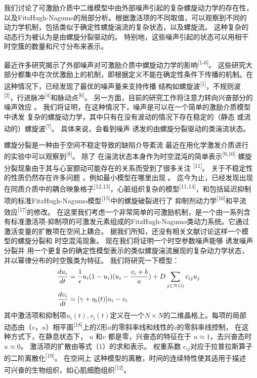 \documentclass[
bachelor,
nofont, %
pdflinks,
]{xjtuthesis}
\begin{document}

\newcommand{\apcite}[1]{\textsuperscript{[#1]}}


我们讨论了可激励介质中⼆维模型中由外部噪声引起的复杂螺旋动⼒学的存在性，以及FitzHugh-Nagumo的局部分析。根据激活项的不同取值，可以观察到不同的动⼒学机制，包括类似于确定性螺旋湍流的复杂状态，以及螺旋流。 这种复杂的动态⾏为被认为是由螺旋分裂驱动的。 
特别地，这些噪声引起的状态可以⽤相⼲时空簇的数量和尺⼨分布来表示。 


最近许多研究揭⽰了外部噪声对可激励介质中螺旋动⼒学的影响\apcite{1-6}。 这些研究⼤部分都集中在次优激励上的机制，即根据定义不能在确定性条件下传播的机制。在这种情况下，已经发现了最优的噪声量来⽀持传播
结构如螺旋波\apcite{1}，不规则波\apcite{2}，⾏进脉冲\apcite{4}和脉动点\apcite{6}。
另⼀⽅⾯，⽬前的研究⼯作将注意⼒转向兴奋部分的噪声效应
。 我们将证明，在这种情况下，噪声是可以在⼀个简单的激励介质模型中诱发
复杂的螺旋动⼒学，其中只有在没有波动的情况下存在稳定的（静态
或流动的）螺旋波\apcite{7}。 具体来说，会看到噪声
诱发的由螺旋分裂驱动的类湍流状态。

\medskip

螺旋分裂是⼀种由于空间不稳定导致的缺陷介导紊流
最近在⽤化学激发介质进⾏的实验中可以观察到\apcite{8}。 除了
在湍流状态本⾝作为时空混沌的简单表⽰\apcite{9,10}
螺旋分裂现象由于其与⼼室颤动可能存在的关系⽽受到了很多关注
\apcite{11}。 关于不稳定性的性质仍然存在许多问题
，例如最⼩模型在哪里出现
。 迄今为⽌，已经发现出现在同质介质中的耦合映象格子\apcite{12,13}，⼼脏组织复杂的模型\apcite{11,14}，和包括延迟抑制项的标准FitzHugh-Nagumo模型\apcite{15}中的螺旋破裂进⾏了
抑制剂动⼒学\apcite{16}和平流效应\apcite{17}的修改。 在这⾥我们考虑⼀个⾮常简单的可激励机制，是一个由⼀系列含有标准激活项-抑制项的可激发元素组成的FitzHugh-Nagumo类动⼒系统。它通过激活变量的扩散项在空间上耦合。
据我们所知，还没有相关文献讨论这样⼀个模型的螺旋分裂和
时空混沌现象。 现在我们将证明⼀个时空参数噪声能够
诱发噪声分裂并
用一个更复杂的确定性模型表示的类似螺旋湍流展现的复杂动⼒学状态，并以幂律分布的时空簇类为特征。
\medskip
我们将研究一下模型：
\begin{align}
\dfrac{du_i}{dt}&=\dfrac{1}{\epsilon}u_i(1-u_i)(u_i-\dfrac{v_i+b}{a})+D\sum_{j \in N(i)}c_{ij}u_j\\
\notag \dfrac{dv_i}{dt}&=[\gamma+\eta_i(t)]u_i-v_i
\end{align}
其中激活项和抑制项$u_i(t),v_i(t)$定义在一个$N\times N$的二维晶格上。每项的局部动态由$（ v，u ）$相平⾯\apcite{18}上的Z形$u$的零斜率线和线性的$v$的零斜率线控制，
在这种⽅式下，在静息状态下， $u$ 和$v$ 都是零，兴奋态的特征在于
$u \approx 1$，去兴奋态时$u \approx 0$。 激活项的扩散由等式（1）的求和表示。 权重系数
$c_{ij}$对应于拉普拉斯算⼦的⼆阶离散化\apcite{19}。 在空间上
这种模型的离散，时间的连续特性使其适⽤于描述
可兴奋的⽣物组织，如⼼肌细胞组织\apcite{12}。
\end{document}
